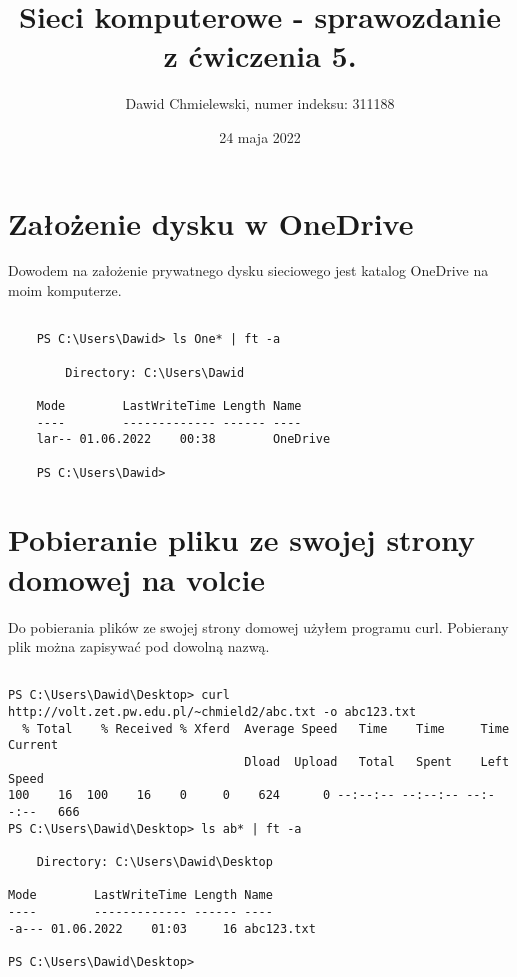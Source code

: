 \documentclass[a4paper,11pt]{article}
\begin{document}
\title{ Sieci komputerowe - sprawozdanie z ćwiczenia 5. }
\author{ Dawid Chmielewski, numer indeksu: 311188 }
\date{24 maja 2022}


\section{Założenie dysku w OneDrive}

Dowodem na założenie prywatnego dysku sieciowego jest katalog OneDrive na moim komputerze.

\begin{verbatim}

    PS C:\Users\Dawid> ls One* | ft -a

        Directory: C:\Users\Dawid
    
    Mode        LastWriteTime Length Name
    ----        ------------- ------ ----
    lar-- 01.06.2022    00:38        OneDrive
    
    PS C:\Users\Dawid>

\end{verbatim}

\section{Pobieranie pliku ze swojej strony domowej na volcie}

Do pobierania plików ze swojej strony domowej użyłem programu curl. Pobierany plik można zapisywać pod dowolną nazwą.

\begin{verbatim}

PS C:\Users\Dawid\Desktop> curl http://volt.zet.pw.edu.pl/~chmield2/abc.txt -o abc123.txt
  % Total    % Received % Xferd  Average Speed   Time    Time     Time  Current
                                 Dload  Upload   Total   Spent    Left  Speed
100    16  100    16    0     0    624      0 --:--:-- --:--:-- --:--:--   666
PS C:\Users\Dawid\Desktop> ls ab* | ft -a

    Directory: C:\Users\Dawid\Desktop

Mode        LastWriteTime Length Name
----        ------------- ------ ----
-a--- 01.06.2022    01:03     16 abc123.txt

PS C:\Users\Dawid\Desktop>

\end{verbatim}
\end{document}
